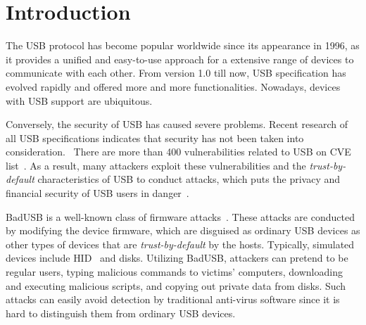 \section{Introduction}
\label{sec:introduction}

The \ac{USB} protocol has become popular worldwide
since its appearance in 1996, as it provides a unified and easy-to-use approach for a
extensive range of devices to communicate with each other.  From version 1.0 till
now, \ac{USB} specification has evolved rapidly and offered more and more
functionalities.  Nowadays, devices with \ac{USB} support are ubiquitous.

Conversely, the security of \ac{USB} has caused severe problems.
Recent research of all USB specifications indicates that security has not been taken into consideration.~\cite{sok}  There are more than 400
vulnerabilities related to \ac{USB} on CVE list~\cite{website:CVE-list}.  As a
result, many attackers exploit these vulnerabilities and the
\textit{trust-by-default} characteristics of \ac{USB} to conduct attacks, which puts
the privacy and financial security of \ac{USB} users in danger~\cite{sok}.

BadUSB is a well-known class of firmware attacks~\cite{badusb}.  These attacks
are conducted by modifying the device firmware, which are disguised
 as ordinary \ac{USB} devices as other types of devices that are \textit{trust-by-default}
by the hosts.  Typically, simulated devices include \ac{HID}~\cite{hid} and disks.  Utilizing BadUSB,
attackers can pretend to be regular users, typing malicious commands to
victims' computers, downloading and executing malicious scripts, and copying out
private data from disks.  Such attacks can easily avoid detection by traditional
anti-virus software since it is hard to distinguish them from ordinary \ac{USB}
devices.

